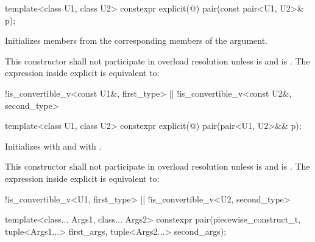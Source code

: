 %
\begin{itemdecl}
template<class U1, class U2> constexpr explicit(@\seebelow@) pair(const pair<U1, U2>& p);
\end{itemdecl}

\begin{itemdescr}
\pnum
\effects
Initializes members from the corresponding members of the argument.

\pnum
\remarks This constructor shall not participate in overload resolution unless
 is  and
 is .
The expression inside explicit is equivalent to:
\begin{codeblock}
!is_convertible_v<const U1&, first_type> || !is_convertible_v<const U2&, second_type>
\end{codeblock}
\end{itemdescr}

%
\begin{itemdecl}
template<class U1, class U2> constexpr explicit(@\seebelow@) pair(pair<U1, U2>&& p);
\end{itemdecl}

\begin{itemdescr}
\pnum
\effects
Initializes  with
and  with
.

\pnum
\remarks This constructor shall not participate in overload resolution unless
 is  and
 is .
The expression inside explicit is equivalent to:
\begin{codeblock}
!is_convertible_v<U1, first_type> || !is_convertible_v<U2, second_type>
\end{codeblock}
\end{itemdescr}

%
\begin{itemdecl}
template<class... Args1, class... Args2>
  constexpr pair(piecewise_construct_t,
                 tuple<Args1...> first_args, tuple<Args2...> second_args);
\end{itemdecl}

